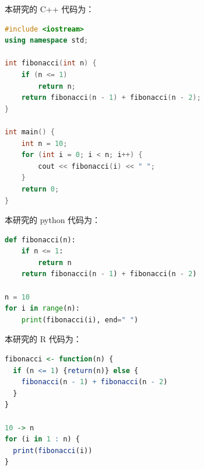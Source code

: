 
\setlength{\headheight}{13pt}

\songti{} 
本研究的 C++ 代码为：

\begin{lstlisting}[language=C++, caption={Fibonacci sequence in C++}]
#include <iostream>
using namespace std;

int fibonacci(int n) {
    if (n <= 1)
        return n;
    return fibonacci(n - 1) + fibonacci(n - 2);
}

int main() {
    int n = 10;
    for (int i = 0; i < n; i++) {
        cout << fibonacci(i) << " ";
    }
    return 0;
}
\end{lstlisting}

本研究的 python 代码为：

\begin{lstlisting}[language=Python, caption={Fibonacci sequence in Python}]
def fibonacci(n):
    if n <= 1:
        return n
    return fibonacci(n - 1) + fibonacci(n - 2)

n = 10
for i in range(n):
    print(fibonacci(i), end=" ")
\end{lstlisting}

本研究的 R 代码为：

\begin{lstlisting}[language=R, caption={Fibonacci sequence in R}]
fibonacci <- function(n) {
  if (n <= 1) {return(n)} else {
    fibonacci(n - 1) + fibonacci(n - 2)
  }
}

10 -> n
for (i in 1 : n) {
  print(fibonacci(i))
}
\end{lstlisting}